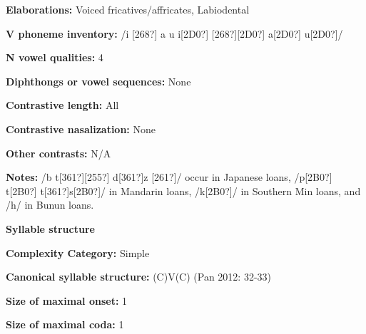 \begin{styleBody}
\textbf{Elaborations:} Voiced fricatives/affricates, Labiodental
\end{styleBody}

\begin{styleBody}
\textbf{V phoneme inventory:} /i [268?] a u i[2D0?] [268?][2D0?] a[2D0?] u[2D0?]/
\end{styleBody}

\begin{styleBody}
\textbf{N vowel qualities:} 4
\end{styleBody}

\begin{styleBody}
\textbf{Diphthongs or vowel sequences:} None
\end{styleBody}

\begin{styleBody}
\textbf{Contrastive length:} All
\end{styleBody}

\begin{styleBody}
\textbf{Contrastive nasalization:} None
\end{styleBody}

\begin{styleBody}
\textbf{Other contrasts:} N/A
\end{styleBody}

\begin{styleBody}
\textbf{Notes:} /b t[361?][255?] d[361?]z [261?]/ occur in Japanese loans, /p[2B0?] t[2B0?] t[361?]s[2B0?]/ in Mandarin loans, /k[2B0?]/ in Southern Min loans, and /h/ in Bunun loans.
\end{styleBody}

\begin{styleBody}
\textbf{Syllable structure}
\end{styleBody}

\begin{styleBody}
\textbf{Complexity Category:} Simple
\end{styleBody}

\begin{styleBody}
\textbf{Canonical syllable structure:} (C)V(C) (Pan 2012: 32-33)
\end{styleBody}

\begin{styleBody}
\textbf{Size of maximal onset:} 1
\end{styleBody}

\begin{styleBody}
\textbf{Size of maximal coda: }1
\end{styleBody}

